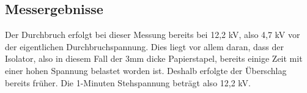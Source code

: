 \documentclass[a4paper,twoside,12pt,DIV=13,BCOR=5mm,numbers=noenddot,cleardoublepage=empty]{scrbook}
\begin{document}
		\subsection{Messergebnisse}
		Der Durchbruch erfolgt bei dieser Messung bereits bei 12,2 kV, also 4,7 kV vor der eigentlichen Durchbruchspannung.
		Dies liegt vor allem daran, dass der Isolator, also in diesem Fall der 3mm dicke Papierstapel, bereits einige Zeit mit einer hohen Spannung belastet worden ist.
		Deshalb erfolgte der \"Uberschlag bereits fr\"uher. Die 1-Minuten Stehspannung betr\"agt also 12,2 kV.
\listoffigures	
\end{document}
